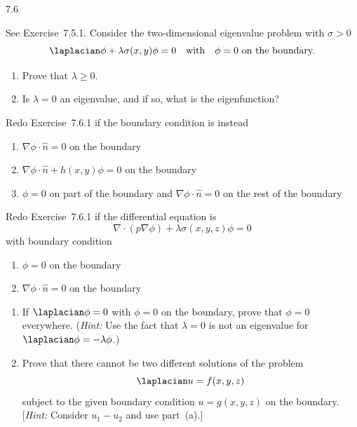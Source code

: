 \begin{exercises}{7.6}

\item See Exercise~7.5.1.  Consider the two-dimensional eigenvalue problem with $\sigma > 0$
\[
\laplacian\phi + \lambda\sigma(x,y)\phi = 0 \quad\text{with}\quad \phi = 0 \text{ on the boundary.}
\]

\begin{enumerate}
\item[(a)] Prove that $\lambda \geq 0$.

\item[(b)] Is $\lambda = 0$ an eigenvalue, and if so, what is the eigenfunction?
\end{enumerate}

\item Redo Exercise~7.6.1 if the boundary condition is instead
\begin{enumerate}
\item[(a)] $\nabla\phi\cdot\hat{n} = 0$ on the boundary
\item[(b)] $\nabla\phi\cdot\hat{n} + h(x,y)\phi = 0$ on the boundary
\item[(c)] $\phi = 0$ on part of the boundary and $\nabla\phi\cdot\hat{n} = 0$ on the rest of the boundary
\end{enumerate}

\item Redo Exercise~7.6.1 if the differential equation is
\[
\nabla\cdot(p\nabla\phi) + \lambda\sigma(x,y,z)\phi = 0
\]
with boundary condition
\begin{enumerate}
\item[(a)] $\phi = 0$ on the boundary
\item[(b)] $\nabla\phi\cdot\hat{n} = 0$ on the boundary
\end{enumerate}

\item
\begin{enumerate}
\item[(a)] If $\laplacian\phi = 0$ with $\phi = 0$ on the boundary, prove that $\phi = 0$ everywhere.  (\emph{Hint:} Use the fact that $\lambda = 0$ is not an eigenvalue for $\laplacian\phi = -\lambda\phi$.)

\item[(b)] Prove that there cannot be two different solutions of the problem
\[
\laplacian u = f(x,y,z)
\]
subject to the given boundary condition $u = g(x,y,z)$ on the boundary. [\emph{Hint:} Consider $u_1 - u_2$ and use part~(a).]
\end{enumerate}

\end{exercises}
